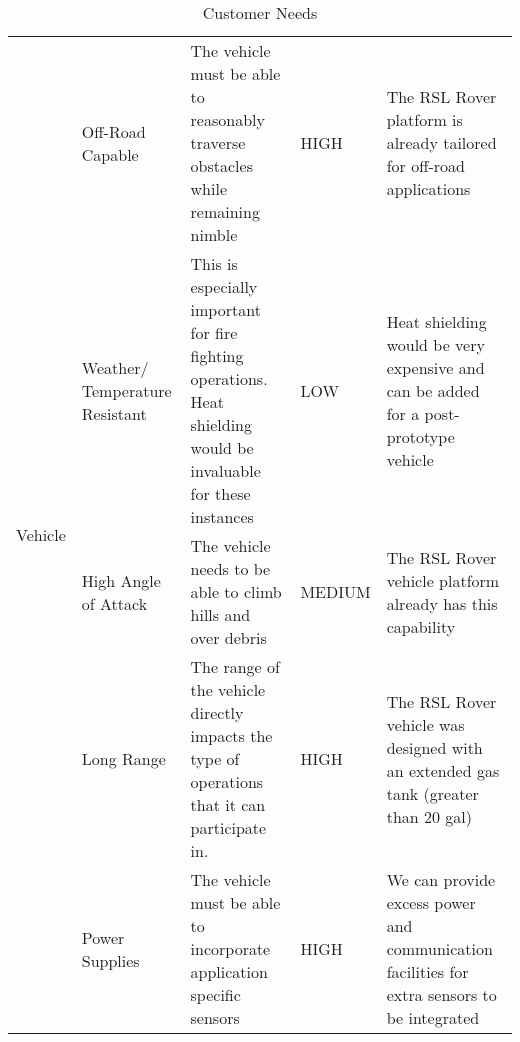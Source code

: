 \begin{table}[h]
\begin{adjustwidth}{-0.5in}{-0.5in}
{\begin{tabular}{|p{3cm}|p{2cm}|p{5cm}|p{1.5cm}|p{5cm}|}
\multirow{5}{*}{Vehicle} & Off-Road Capable & The vehicle must be able to reasonably traverse obstacles while remaining nimble & HIGH & The RSL Rover platform is already tailored for off-road applications \\ \cline{2-5}
& Weather/ Temperature Resistant & This is especially important for fire fighting operations. Heat shielding would be invaluable for these instances & LOW & Heat shielding would be very expensive and can be added for a post-prototype vehicle \\ \cline{2-5}
& High Angle of Attack & The vehicle needs to be able to climb hills and over debris & MEDIUM & The RSL Rover vehicle platform already has this capability \\ \cline{2-5}
& Long Range & The range of the vehicle directly impacts the type of operations that it can participate in.  & HIGH & The RSL Rover vehicle was designed with an extended gas tank (greater than 20 gal) \\ \cline{2-5}
& Power Supplies & The vehicle must be able to incorporate application specific sensors & HIGH & We can provide excess power and communication facilities for extra sensors to be integrated \\ \hline

\end{tabular}
}
\caption{Customer Needs \label{tab:CustomerNeeds}}
\end{adjustwidth}
\end{table}

